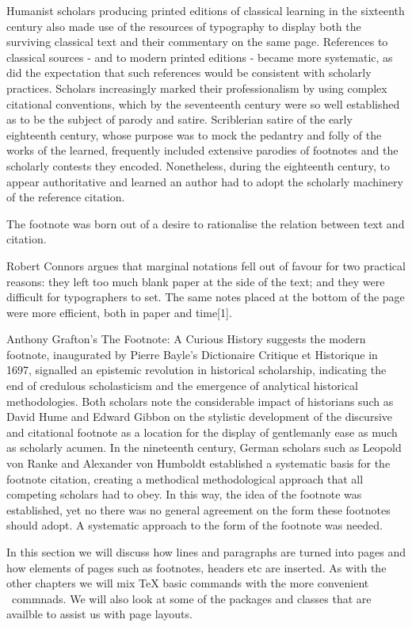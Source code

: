 Humanist scholars producing printed editions of classical learning in the sixteenth century also made use of the resources of typography to display both the surviving classical text and their commentary on the same page. References to classical sources - and to modern printed editions - became more systematic, as did the expectation that such references would be consistent with scholarly practices. Scholars increasingly marked their professionalism by using complex citational conventions, which by the seventeenth century were so well established as to be the subject of parody and satire. Scriblerian satire of the early eighteenth century, whose purpose was to mock the pedantry and folly of the works of the learned, frequently included extensive parodies of footnotes and the scholarly contests they encoded. Nonetheless, during the eighteenth century, to appear authoritative and learned an author had to adopt the scholarly machinery of the reference citation.

The footnote was born out of a desire to rationalise the relation between text and citation. 

Robert Connors argues that marginal notations fell out of favour for two practical reasons: they left too much blank paper at the side of the text; and they were difficult for typographers to set. The same notes placed at the bottom of the page were more efficient, both in paper and time[1]. 

Anthony Grafton's The Footnote: A Curious History suggests the modern footnote, inaugurated by Pierre Bayle's Dictionaire Critique et Historique in 1697, signalled an epistemic revolution in historical scholarship, indicating the end of credulous scholasticism and the emergence of analytical historical methodologies. Both scholars note the considerable impact of historians such as David Hume and Edward Gibbon on the stylistic development of the discursive and citational footnote as a location for the display of gentlemanly ease as much as scholarly acumen. In the nineteenth century, German scholars such as Leopold von Ranke and Alexander von Humboldt established a systematic basis for the footnote citation, creating a methodical methodological approach that all competing scholars had to obey. In this way, the idea of the footnote was established, yet no there was no general agreement on the form these footnotes should adopt. A systematic approach to the form of the footnote was needed.

In this section we will discuss how lines and paragraphs are turned into pages and how elements of pages such as footnotes, headers etc are inserted. As with the other chapters we will mix TeX basic commands with the more convenient \LaTeXe\ commnads. We will also look at some of the packages and classes that are availble to assist us with page layouts. 


